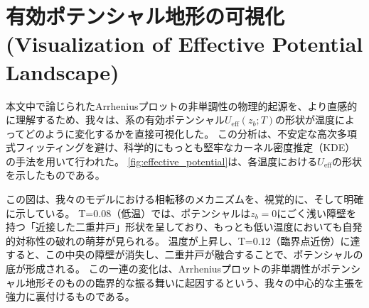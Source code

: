 \documentclass[a4paper,11pt,ja=standard,lualatex]{bxjsarticle}
\newcommand{\figref}[1]{\cref{#1}}
\begin{document}
\section{有効ポテンシャル地形の可視化 (Visualization of Effective Potential Landscape)}
\label{sec:appendix_potential}
本文中で論じられたArrheniusプロットの非単調性の物理的起源を、より直感的に理解するため、我々は、系の有効ポテンシャル$U_{\mathrm{eff}}(z_b; T)$の形状が温度によってどのように変化するかを直接可視化した。
この分析は、不安定な高次多項式フィッティングを避け、科学的にもっとも堅牢なカーネル密度推定（KDE）の手法を用いて行われた。
\figref{fig:effective_potential}は、各温度における$U_{\mathrm{eff}}$の形状を示したものである。

この図は、我々のモデルにおける相転移のメカニズムを、視覚的に、そして明確に示している。
T=0.08（低温）では、ポテンシャルは$z_b=0$にごく浅い障壁を持つ「近接した二重井戸」形状を呈しており、もっとも低い温度においても自発的対称性の破れの萌芽が見られる。
温度が上昇し、T=0.12（臨界点近傍）に達すると、この中央の障壁が消失し、二重井戸が融合することで、ポテンシャルの底が形成される。
この一連の変化は、Arrheniusプロットの非単調性がポテンシャル地形そのものの臨界的な振る舞いに起因するという、我々の中心的な主張を強力に裏付けるものである。
\end{document}
